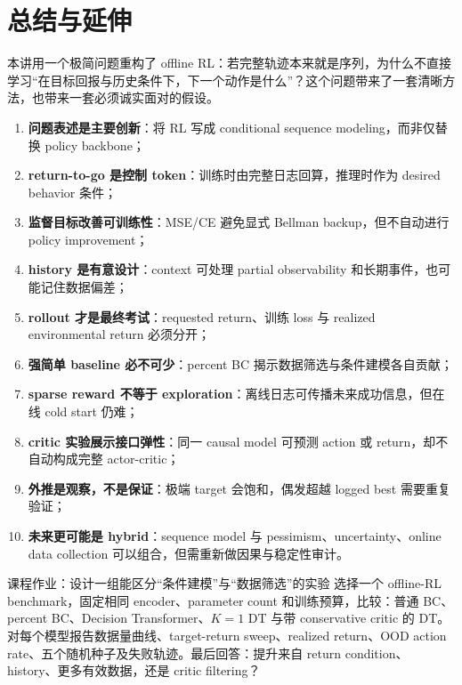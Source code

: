 \section{总结与延伸}

本讲用一个极简问题重构了 offline RL：若完整轨迹本来就是序列，为什么不直接学习“在目标回报与历史条件下，下一个动作是什么”？这个问题带来了一套清晰方法，也带来一套必须诚实面对的假设。

\begin{enumerate}
  \item \textbf{问题表述是主要创新}：将 RL 写成 conditional sequence modeling，而非仅替换 policy backbone；
  \item \textbf{return-to-go 是控制 token}：训练时由完整日志回算，推理时作为 desired behavior 条件；
  \item \textbf{监督目标改善可训练性}：MSE/CE 避免显式 Bellman backup，但不自动进行 policy improvement；
  \item \textbf{history 是有意设计}：context 可处理 partial observability 和长期事件，也可能记住数据偏差；
  \item \textbf{rollout 才是最终考试}：requested return、训练 loss 与 realized environmental return 必须分开；
  \item \textbf{强简单 baseline 必不可少}：percent BC 揭示数据筛选与条件建模各自贡献；
  \item \textbf{sparse reward 不等于 exploration}：离线日志可传播未来成功信息，但在线 cold start 仍难；
  \item \textbf{critic 实验展示接口弹性}：同一 causal model 可预测 action 或 return，却不自动构成完整 actor-critic；
  \item \textbf{外推是观察，不是保证}：极端 target 会饱和，偶发超越 logged best 需要重复验证；
  \item \textbf{未来更可能是 hybrid}：sequence model 与 pessimism、uncertainty、online data collection 可以组合，但需重新做因果与稳定性审计。
\end{enumerate}

\begin{importantbox}{课程作业：设计一组能区分“条件建模”与“数据筛选”的实验}
选择一个 offline-RL benchmark，固定相同 encoder、parameter count 和训练预算，比较：普通 BC、percent BC、Decision Transformer、$K=1$ DT 与带 conservative critic 的 DT。对每个模型报告数据量曲线、target-return sweep、realized return、OOD action rate、五个随机种子及失败轨迹。最后回答：提升来自 return condition、history、更多有效数据，还是 critic filtering？
\end{importantbox}

